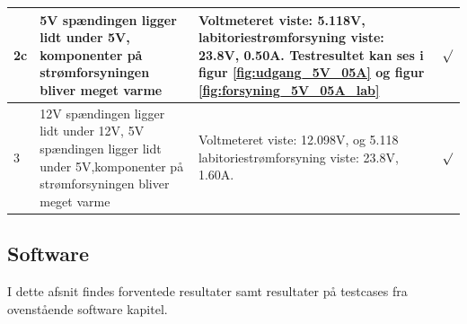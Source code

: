 \begin{table}[H]
\begin{tabular}{| p{1cm}  | p{4cm} | p{6cm} | p{1cm} |}
2c &5V spændingen ligger lidt under 5V, komponenter på strømforsyningen bliver meget varme &Voltmeteret viste: 5.118V, labitoriestrømforsyning viste: 23.8V, 0.50A. Testresultet kan ses i figur  \ref{fig:udgang_5V_05A} og figur \ref{fig:forsyning_5V_05A_lab} & \begin{Huge}$\surd$\end{Huge}\\ \hline
3 &12V spændingen ligger lidt under 12V, 5V spændingen ligger lidt under 5V,komponenter på strømforsyningen bliver meget varme &Voltmeteret viste: 12.098V, og 5.118 labitoriestrømforsyning viste: 23.8V, 1.60A. & \begin{Huge}$\surd$\end{Huge}\\ \hline
\end{tabular}
\end{table}

\subsection{Software}
I dette afsnit findes forventede resultater samt resultater på testcases fra ovenstående software kapitel.\\
